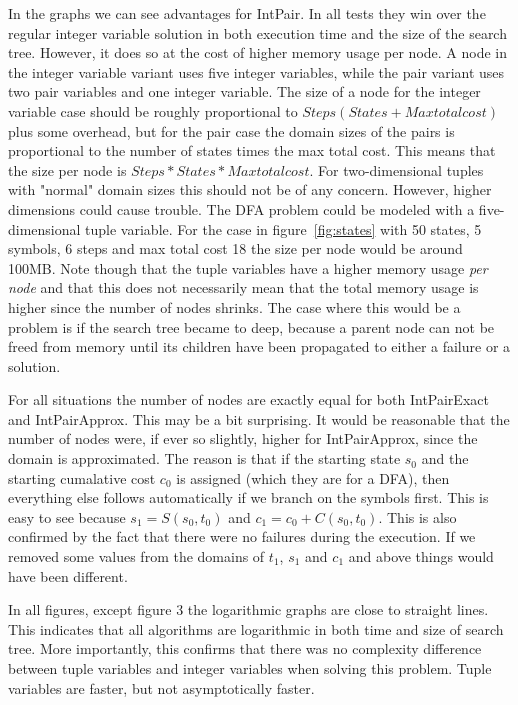 \documentclass[a4paper,11pt]{article}
\begin{document}
In the graphs we can see advantages for IntPair. In all tests they win over the regular integer variable solution in both execution time and the size of the search tree. However, it does so at the cost of higher memory usage per node. A node in the integer variable variant uses five integer variables, while the pair variant uses two pair variables and one integer variable. The size of a node for the integer variable case should be roughly proportional to $Steps(States + Maxtotalcost)$ plus some overhead, but for the pair case the domain sizes of the pairs is proportional to the number of states times the max total cost. This means that the size per node is $Steps*States*Maxtotalcost$. For two-dimensional tuples with "normal" domain sizes this should not be of any concern. However, higher dimensions could cause trouble. The DFA problem could be modeled with a five-dimensional tuple variable. For the case in figure~\ref{fig:states} with 50 states, 5 symbols, 6 steps and max total cost 18 the size per node would be around 100MB. Note though that the tuple variables have a higher memory usage \textit{per node} and that this does not necessarily mean that the total memory usage is higher since the number of nodes shrinks. The case where this would be a problem is if the search tree became to deep, because a parent node can not be freed from memory until its children have been propagated to either a failure or a solution.

For all situations the number of nodes are exactly equal for both IntPairExact and IntPairApprox. This may be a bit surprising. It would be reasonable that the number of nodes were, if ever so slightly, higher for IntPairApprox, since the domain is approximated. The reason is that if the starting state $s_0$ and the starting cumalative cost $c_0$ is assigned (which they are for a DFA), then everything else follows automatically if we branch on the symbols first. This is easy to see because $s_1=S(s_0, t_0)$ and $c_1=c_0+C(s_0, t_0)$. This is also confirmed by the fact that there were no failures during the execution. If we removed some values from the domains of $t_1$, $s_1$ and $c_1$ and above things would have been different. 

In all figures, except figure 3 the logarithmic graphs are close to straight lines. This indicates that all algorithms are logarithmic in both time and size of search tree. More importantly, this confirms that there was no complexity difference between tuple variables and integer variables when solving this problem. Tuple variables are faster, but not asymptotically faster.
\end{document}
